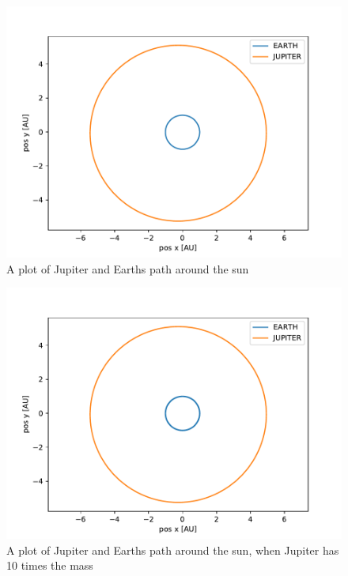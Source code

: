 \documentclass[a4paper]{article}
\begin{document}
\begin{figure}[h!]
		\centering 
		\includegraphics[scale=0.7]{../opp_e1.pdf}
		\caption{A plot of Jupiter and Earths path around the sun}
		\label{e_1}
\end{figure}
\begin{figure}[h!]
	\centering 
	\includegraphics[scale=0.7]{../opp_e10.pdf}
	\caption{A plot of Jupiter and Earths path around the sun, when Jupiter has 10 times the mass}
	\label{e_10}
\end{figure}
\end{document}
